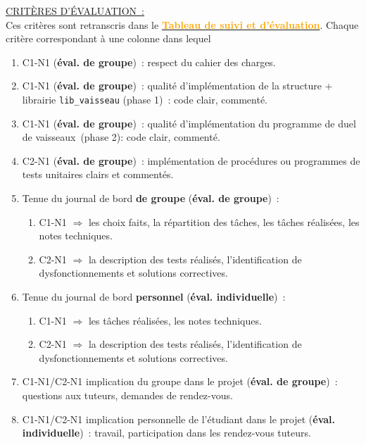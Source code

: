 \documentclass[10pt, fleqn, a4paper]{article}
\newcommand{\bfcolor}[2]{\textcolor{#1}{\textbf{#2}}}
\newcommand\myframecolor{}
\newcommand\mybgcolor{}
\newenvironment{mycolorbox}[2]
{
\def\myframecolor{#1}
\def\mybgcolor{#2}
\begingroup
\begin{lrbox}{\mytextbox}
\begin{minipage}[t]{\textwidth}
}
{
\end{minipage}\end{lrbox}
\fcolorbox{\myframecolor}{\mybgcolor}{\usebox{\mytextbox}}
\endgroup
}
\def\TABLEAUEVAL{\href{https://docs.google.com/spreadsheets/d/18LC7yuCl2cteuaYs7VfMBd0qE6IhRl_J6CCGcIUdCyk/edit?usp=sharing}{\bfcolor{orange}{Tableau de suivi et d'évaluation}}}
\newcounter{quest}
\begin{document}
\begin{mycolorbox}{black}{yellow}
\underline{CRITÈRES D'ÉVALUATION~:}\\
Ces critères sont retranscris dans le \TABLEAUEVAL. Chaque critère correspondant à une colonne dans lequel 
\begin{enumerate}
\item \colorbox{redC1}{C1-N1} (\textbf{éval. de groupe})~: respect du cahier des charges.
\item \colorbox{redC1}{C1-N1} (\textbf{éval. de groupe})~: qualité d'implémentation de la structure + librairie \texttt{lib\_vaisseau} (phase 1)~: code clair, commenté.
\item \colorbox{redC1}{C1-N1} (\textbf{éval. de groupe})~: qualité d'implémentation du programme de duel de vaisseaux~(phase 2): code clair, commenté.
\item \colorbox{greenC2}{C2-N1} (\textbf{éval. de groupe})~: implémentation de procédures ou programmes de tests unitaires clairs et commentés.
\item \colorbox{yellowPORTFOLIO}{Tenue du journal de bord \textbf{de groupe} (\textbf{éval. de groupe})~:}
\begin{enumerate}
\item \colorbox{redC1}{C1-N1} $\Rightarrow$ les choix faits, la répartition des tâches, les tâches réalisées, les notes techniques.
\item \colorbox{greenC2}{C2-N1} $\Rightarrow$ la description des tests réalisés, l'identification de dysfonctionnements et solutions correctives.
\end{enumerate}
\item \colorbox{yellowPORTFOLIO}{Tenue du journal de bord \textbf{personnel} (\textbf{éval. individuelle})~:}
\begin{enumerate}
\item \colorbox{redC1}{C1-N1} $\Rightarrow$ les tâches réalisées, les notes techniques.
\item \colorbox{greenC2}{C2-N1} $\Rightarrow$ la description des tests réalisés, l'identification de dysfonctionnements et solutions correctives.
\end{enumerate}
\item \colorbox{redC1}{C1-N1}/\colorbox{greenC2}{C2-N1} implication du groupe dans le projet (\textbf{éval. de groupe})~: questions aux tuteurs, demandes de rendez-vous.
\item \colorbox{redC1}{C1-N1}/\colorbox{greenC2}{C2-N1} implication personnelle de l'étudiant dans le projet (\textbf{éval. individuelle})~: travail, participation dans les rendez-vous tuteurs.
\end{enumerate}
\end{mycolorbox}
\end{document}

